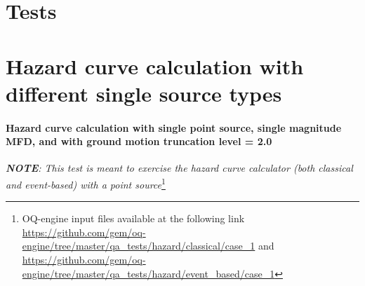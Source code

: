 \section{Tests} 
\section{Hazard curve calculation with different single source types}
\paragraph{Hazard curve calculation with single point
source, single magnitude MFD, and with ground motion truncation level = 2.0}
%
\textit{\textbf{NOTE}: This test is meant to exercise the hazard curve
calculator (both classical and event-based) with a point
source}\footnote{OQ-engine input files available at the following link
\url{https://github.com/gem/oq-engine/tree/master/qa_tests/hazard/classical/case_1}
and 
\url{https://github.com/gem/oq-engine/tree/master/qa_tests/hazard/event_based/case_1}}

